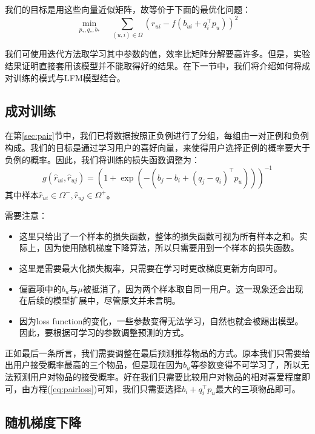 \documentclass[12pt]{article} %
\newcommand\qq{\boldsymbol{\mathit{q}}}
\newcommand\pp{\boldsymbol{\mathit{p}}}
\begin{document}
\begin{sloppypar}
我们的目标是用这些向量近似矩阵，故等价于下面的最优化问题：
\begin{equation}
\underset{\pp_*, \qq_*, b_*}{\operatorname{min}} \quad 
\sum_{(u, i)\in\Omega} \left(r_{ui} - f(b_{ui} + \qq_i^\top \pp_u)\right)^2
\end{equation}

我们可使用迭代方法取学习其中参数的值，效率比矩阵分解要高许多。但是，实验结果证明直接套用该模型并不能取得好的结果。在下一节中，我们将介绍如何将成对训练的模式与LFM模型结合。


\subsection{成对训练}

在第\ref{sec:pair}节中，我们已将数据按照正负例进行了分组，每组由一对正例和负例构成。我们的目标是通过学习用户的喜好向量，来使得用户选择正例的概率要大于负例的概率。因此，我们将训练的损失函数调整为：
\begin{equation}
\label{eq:pairloss}
g(\hat{r}_{ui}, \hat{r}_{uj}) = \left(1 + \exp\left(- \left(b_j - b_i + (\qq_j - \qq_i)^\top \pp_u \right)\right)\right)^{-1}
\end{equation}
其中样本$\hat{r}_{ui}\in \Omega^-,\hat{r}_{uj} \in \Omega^+$。

需要注意：
\begin{itemize}
\item 这里只给出了一个样本的损失函数，整体的损失函数可视为所有样本之和。实际上，因为使用随机梯度下降算法，所以只需要用到一个样本的损失函数。
\item 这里是需要最大化损失概率，只需要在学习时更改梯度更新方向即可。
\item 偏置项中的$b_u$与$\mu$被抵消了，因为两个样本取自同一用户。这一现象还会出现在后续的模型扩展中，尽管原文并未言明。
\item 因为loss function的变化，一些参数变得无法学习，自然也就会被踢出模型。因此，要根据可学习的参数调整预测的方式。
\end{itemize}

正如最后一条所言，我们需要调整在最后预测推荐物品的方式。原本我们只需要给出用户接受概率最高的三个物品，但是现在因为$b_u$等参数变得不可学习了，所以无法预测用户对物品的接受概率。好在我们只需要比较用户对物品的相对喜爱程度即可，由方程(\ref{eq:pairloss})可知，我们只需要选择$b_i + \qq_i^\top\pp_u$最大的三项物品即可。


\subsection{随机梯度下降}


\end{sloppypar}
\end{document}
